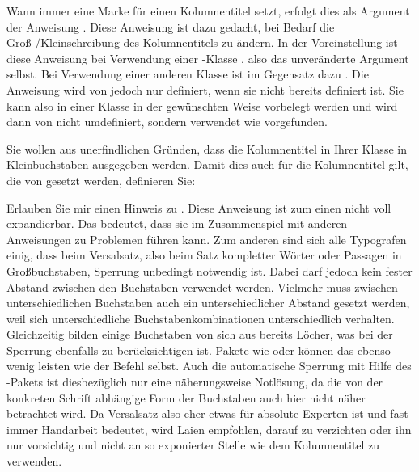 \begin{Declaration}
\end{Declaration}
Wann immer  eine Marke für einen Kolumnentitel setzt,
erfolgt dies als Argument der Anweisung . Diese Anweisung
ist dazu gedacht, bei Bedarf die Groß-/Kleinschreibung des Kolumnentitels zu
ändern. In der Voreinstellung ist diese Anweisung bei Verwendung einer
\KOMAScript-Klasse
, also
das unveränderte Argument selbst. Bei Verwendung einer anderen Klasse ist
 im Gegensatz dazu
.
Die Anweisung wird von  jedoch nur definiert, wenn sie
nicht bereits definiert ist. Sie kann also in einer Klasse in der gewünschten
Weise vorbelegt werden und wird dann von  nicht umdefiniert,
sondern verwendet wie vorgefunden.
\begin{Example}
  Sie wollen aus unerfindlichen Gründen, dass die Kolumnentitel in Ihrer
  Klasse in Kleinbuchstaben ausgegeben werden. Damit dies auch für die
  Kolumnentitel gilt, die von  gesetzt werden, definieren
  Sie:
\begin{lstcode}
  \let\MakeMarkcase\MakeLowercase
\end{lstcode}
\end{Example}

Erlauben Sie mir einen Hinweis zu . Diese
Anweisung ist zum einen nicht voll expandierbar. Das bedeutet, dass sie im
Zusammenspiel mit anderen Anweisungen zu Problemen führen kann. Zum anderen
sind sich alle Typografen einig, dass beim Versalsatz, also beim Satz
kompletter Wörter oder Passagen in Großbuchstaben, Sperrung unbedingt
notwendig ist. Dabei darf jedoch kein fester Abstand zwischen den Buchstaben
verwendet werden. Vielmehr muss zwischen unterschiedlichen Buchstaben auch ein
unterschiedlicher Abstand gesetzt werden, weil sich unterschiedliche
Buchstabenkombinationen unterschiedlich verhalten. Gleichzeitig bilden einige
Buchstaben von sich aus bereits Löcher, was bei der Sperrung ebenfalls zu
berücksichtigen ist. Pakete wie  oder  können das
ebenso wenig leisten wie der Befehl  selbst. Auch die
automatische Sperrung mit Hilfe des -Pakets ist
diesbezüglich nur eine näherungsweise Notlösung, da die von der konkreten
Schrift abhängige Form der Buchstaben auch hier nicht näher betrachtet
wird. Da Versalsatz also eher etwas für absolute
Experten ist und fast immer Handarbeit bedeutet, wird Laien empfohlen, darauf
zu verzichten oder ihn nur vorsichtig und nicht an so exponierter Stelle
wie dem Kolumnentitel zu verwenden.%
\EndIndexGroup


